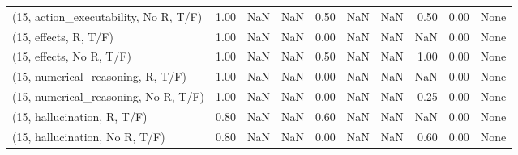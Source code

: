 \begin{table*}[h!]
\begin{adjustbox}{width=2\columnwidth,center}
\begin{tabular}{lrrr|rrr|rrr}
(15, action\_executability, No R, T/F) &                      1.00 &                   NaN &                       NaN &                          0.50 &                       NaN &                           NaN &                                   0.50 &                               0.00 &                                  None \\
(15, effects, R, T/F)                 &                      1.00 &                   NaN &                       NaN &                          0.00 &                       NaN &                           NaN &                                    NaN &                               0.00 &                                  None \\
(15, effects, No R, T/F)              &                      1.00 &                   NaN &                       NaN &                          0.50 &                       NaN &                           NaN &                                   1.00 &                               0.00 &                                  None \\
(15, numerical\_reasoning, R, T/F)     &                      1.00 &                   NaN &                       NaN &                          0.00 &                       NaN &                           NaN &                                    NaN &                               0.00 &                                  None \\
(15, numerical\_reasoning, No R, T/F)  &                      1.00 &                   NaN &                       NaN &                          0.00 &                       NaN &                           NaN &                                   0.25 &                               0.00 &                                  None \\
(15, hallucination, R, T/F)           &                      0.80 &                   NaN &                       NaN &                          0.60 &                       NaN &                           NaN &                                    NaN &                               0.00 &                                  None \\
(15, hallucination, No R, T/F)        &                      0.80 &                   NaN &                       NaN &                          0.00 &                       NaN &                           NaN &                                   0.60 &                               0.00 &                                  None \\

\end{tabular}
\end{adjustbox}
\end{table*}
